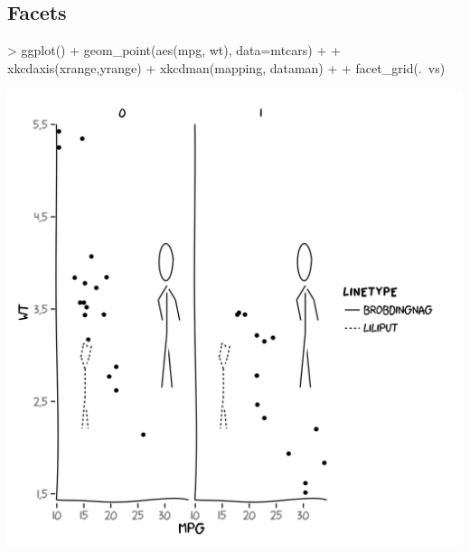 \documentclass[10pt]{article}
\begin{document}
\subsection{Facets}

\begin{center}
\begin{Schunk}
\begin{Sinput}
> ggplot() + geom_point(aes(mpg, wt), data=mtcars) + 
+   xkcdaxis(xrange,yrange) + xkcdman(mapping, dataman) +
+   facet_grid(.~vs)
\end{Sinput}
\end{Schunk}
\includegraphics{xkcd-intro-facetvs}
\end{center}
\end{document}
